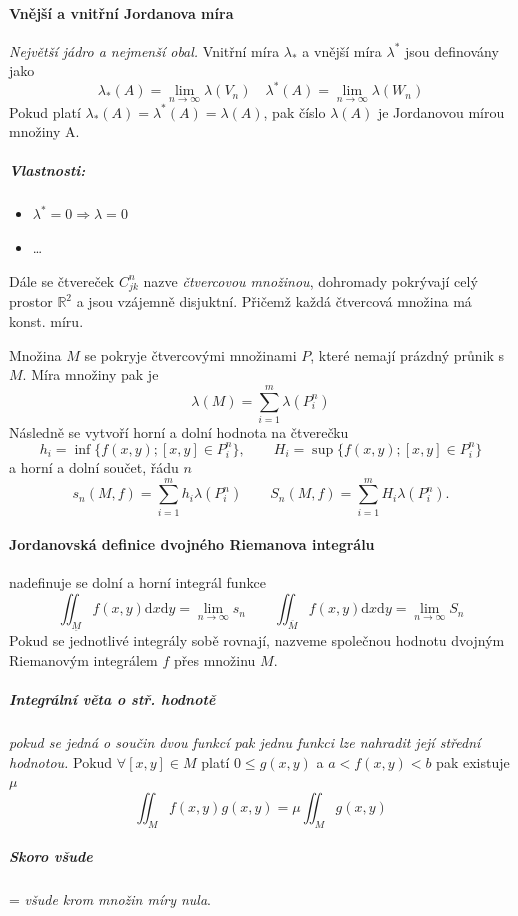\documentclass[a4paper, twoside,%
12pt]{article}
\newcommand{\dif}{\mathrm{d}}
\newcommand{\R}{\mathbb{R}}
\begin{document}
\paragraph{Vnější a vnitřní Jordanova míra} \emph{Největší jádro a nejmenší obal.} Vnitřní míra $\lambda_*$ a vnější míra $\lambda^*$ jsou definovány jako 
$$ \lambda_*(A) = \lim_{n\to\infty} \lambda(V_n) \quad \lambda^*(A) = \lim_{n\to\infty} \lambda(W_n) $$ 
Pokud platí $  \lambda_*(A) = \lambda^*(A) = \lambda (A)$, pak číslo $\lambda (A)$ je Jordanovou mírou množiny A. 

\subparagraph{Vlastnosti:} 
\begin{itemize}
    \item $\lambda^* = 0 \Rightarrow \lambda = 0$
    \item \dots
\end{itemize}

Dále se čtvereček $C_{jk}^n$ nazve \emph{čtvercovou množinou}, dohromady pokrývají celý prostor $\R^2$ a jsou vzájemně disjuktní. Přičemž každá čtvercová množina má konst. míru.

Množina $M$ se pokryje čtvercovými množinami $P$, které nemají prázdný průnik s $M$. Míra množiny pak je
$$\lambda (M) = \sum_{i=1}^m \lambda (P_i^n)$$
Následně se vytvoří horní a dolní hodnota na čtverečku 
$$ h_i= \inf\lbrace f(x,y); [x,y]\in P_i^n  \rbrace, \qquad H_i= \sup\lbrace f(x,y); [x,y]\in P_i^n \rbrace$$
a horní a dolní součet, řádu $n$
$$ s_n(M,f) = \sum_{i=1}^m h_i \lambda(P_i^n) \qquad  S_n(M,f) = \sum_{i=1}^m H_i \lambda(P_i^n). $$

\paragraph{Jordanovská definice dvojného Riemanova integrálu} nadefinuje se dolní a horní integrál funkce 
$$ \iint_{\underline{M}} f(x,y) \dif x \dif y = \lim_{n\to\infty}s_n \qquad \iint_{\overline{M}} f(x,y) \dif x \dif y = \lim_{n\to\infty} S_n $$
Pokud se jednotlivé integrály sobě rovnají, nazveme společnou hodnotu dvojným Riemanovým integrálem $f$ přes množinu $M$.

\subparagraph{Integrální věta o stř. hodnotě} \emph{pokud se jedná o součin dvou funkcí pak jednu funkci lze nahradit její střední hodnotou.}
Pokud $\forall [x,y]\in M$ platí $0\leq g(x,y)$ a $a<f(x,y)<b$ pak existuje $\mu$
$$ \iint_M f(x,y)g(x,y) = \mu\iint_M g(x,y) $$

\subparagraph{Skoro všude} = \emph{všude krom množin míry nula}.
\end{document}
